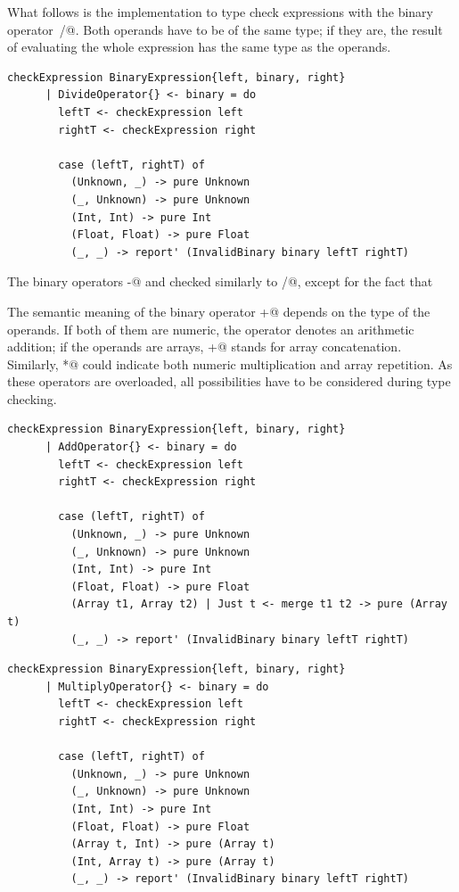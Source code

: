 \documentclass[UdineBachThesis,american,11pt]{PhdThesis}
\begin{document}
  What follows is the implementation to type check expressions with the binary
  operator~\lstinline@/@. Both operands have to be of the same type; if they
  are, the result of evaluating the whole expression has the same type as the
  operands.

  \begin{lstlisting}[gobble=4,basicstyle=\ttfamily\small]
    checkExpression BinaryExpression{left, binary, right}
      | DivideOperator{} <- binary = do
        leftT <- checkExpression left
        rightT <- checkExpression right

        case (leftT, rightT) of
          (Unknown, _) -> pure Unknown
          (_, Unknown) -> pure Unknown
          (Int, Int) -> pure Int
          (Float, Float) -> pure Float
          (_, _) -> report' (InvalidBinary binary leftT rightT)
  \end{lstlisting}

  The binary operators \lstinline@-@ and \lstinline@%@ are type
  checked similarly to \lstinline@/@, except for the fact that
  \lstinline@%@ only accepts operands of type \lstinline@Int@.

  The semantic meaning of the binary operator \lstinline@+@ depends on the type
  of the operands. If both of them are numeric, the operator denotes an
  arithmetic addition; if the operands are arrays, \lstinline@+@ stands for
  array concatenation. Similarly, \lstinline@*@ could indicate both numeric
  multiplication and array repetition. As these operators are overloaded, all
  possibilities have to be considered during type checking.

  \begin{lstlisting}[gobble=4,basicstyle=\ttfamily\small]
    checkExpression BinaryExpression{left, binary, right}
      | AddOperator{} <- binary = do
        leftT <- checkExpression left
        rightT <- checkExpression right

        case (leftT, rightT) of
          (Unknown, _) -> pure Unknown
          (_, Unknown) -> pure Unknown
          (Int, Int) -> pure Int
          (Float, Float) -> pure Float
          (Array t1, Array t2) | Just t <- merge t1 t2 -> pure (Array t)
          (_, _) -> report' (InvalidBinary binary leftT rightT)
  \end{lstlisting}

  \newpage

  \begin{lstlisting}[gobble=4,basicstyle=\ttfamily\small]
    checkExpression BinaryExpression{left, binary, right}
      | MultiplyOperator{} <- binary = do
        leftT <- checkExpression left
        rightT <- checkExpression right

        case (leftT, rightT) of
          (Unknown, _) -> pure Unknown
          (_, Unknown) -> pure Unknown
          (Int, Int) -> pure Int
          (Float, Float) -> pure Float
          (Array t, Int) -> pure (Array t)
          (Int, Array t) -> pure (Array t)
          (_, _) -> report' (InvalidBinary binary leftT rightT)
  \end{lstlisting}
\end{document}

